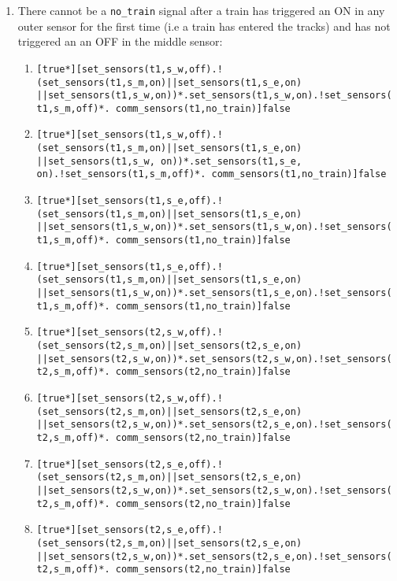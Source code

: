 \documentclass[final]{report}
\begin{document}
\begin{enumerate}
\item There cannot be a \texttt{no\_train} signal after a train has triggered an ON in any outer sensor for the first time (i.e a train has entered the tracks) and has not triggered an 
an OFF in the middle sensor:
\begin{enumerate}[label=\roman*]
\item \texttt{[true*][set\_sensors(t1,s\_w,off).!(set\_sensors(t1,s\_m,on)||set\_sensors(t1,s\_e,on) ||set\_sensors(t1,s\_w,on))*.set\_sensors(t1,s\_w,on).!set\_sensors(t1,s\_m,off)*. comm\_sensors(t1,no\_train)]false}


\item \texttt{[true*][set\_sensors(t1,s\_w,off).!(set\_sensors(t1,s\_m,on)||set\_sensors(t1,s\_e,on) ||set\_sensors(t1,s\_w, on))*.set\_sensors(t1,s\_e, on).!set\_sensors(t1,s\_m,off)*. comm\_sensors(t1,no\_train)]false }


\item \texttt{[true*][set\_sensors(t1,s\_e,off).!(set\_sensors(t1,s\_m,on)||set\_sensors(t1,s\_e,on) ||set\_sensors(t1,s\_w,on))*.set\_sensors(t1,s\_w,on).!set\_sensors(t1,s\_m,off)*. comm\_sensors(t1,no\_train)]false} 


\item \texttt{[true*][set\_sensors(t1,s\_e,off).!(set\_sensors(t1,s\_m,on)||set\_sensors(t1,s\_e,on) ||set\_sensors(t1,s\_w,on))*.set\_sensors(t1,s\_e,on).!set\_sensors(t1,s\_m,off)*. comm\_sensors(t1,no\_train)]false}

\item \texttt{[true*][set\_sensors(t2,s\_w,off).!(set\_sensors(t2,s\_m,on)||set\_sensors(t2,s\_e,on) ||set\_sensors(t2,s\_w,on))*.set\_sensors(t2,s\_w,on).!set\_sensors(t2,s\_m,off)*. comm\_sensors(t2,no\_train)]false}

\item \texttt{[true*][set\_sensors(t2,s\_w,off).!(set\_sensors(t2,s\_m,on)||set\_sensors(t2,s\_e,on) ||set\_sensors(t2,s\_w,on))*.set\_sensors(t2,s\_e,on).!set\_sensors(t2,s\_m,off)*. comm\_sensors(t2,no\_train)]false}


\item \texttt{[true*][set\_sensors(t2,s\_e,off).!(set\_sensors(t2,s\_m,on)||set\_sensors(t2,s\_e,on) ||set\_sensors(t2,s\_w,on))*.set\_sensors(t2,s\_w,on).!set\_sensors(t2,s\_m,off)*. comm\_sensors(t2,no\_train)]false}


\item \texttt{[true*][set\_sensors(t2,s\_e,off).!(set\_sensors(t2,s\_m,on)||set\_sensors(t2,s\_e,on) ||set\_sensors(t2,s\_w,on))*.set\_sensors(t2,s\_e,on).!set\_sensors(t2,s\_m,off)*. comm\_sensors(t2,no\_train)]false}


\end{enumerate}
\end{enumerate}
\end{document}
